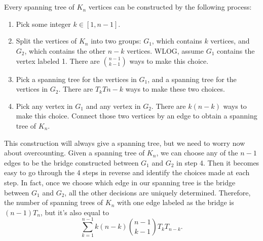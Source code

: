 \documentclass[12pt]{article}
\begin{document}
\section{}
\noindent{}\bigskip\par
Every spanning tree of $K_n$ vertices can be constructed by the following process:
\begin{enumerate}
    \item Pick some integer $k \in [1,n-1]$.
    \item Split the vertices of $K_n$ into two groups: $G_1$, which contains $k$ vertices, and $G_2$, which contains the other $n-k$ vertices. WLOG, assume $G_1$ contains the vertex labeled 1. There are $\binom{n-1}{k-1}$ ways to make this choice.
    \item Pick a spanning tree for the vertices in $G_1$, and a spanning tree for the vertices in $G_2$. There are $T_kT{n-k}$ ways to make these two choices.
    \item Pick any vertex in $G_1$ and any vertex in $G_2$. There are $k(n-k)$ ways to make this choice. Connect those two vertices by an edge to obtain a spanning tree of $K_n$.
    \end{enumerate}
\par
This construction will always give a spanning tree, but we need to worry now about overcounting. Given a spanning tree of $K_n$, we can choose any of the $n-1$ edges to be the bridge constructed between $G_1$ and $G_2$ in step 4. Then it becomes easy to go through the 4 steps in reverse and identify the choices made at each step. In fact, once we choose which edge in our spanning tree is the bridge between $G_1$ and $G_2$, all the other decisions are uniquely determined. Therefore, the number of spanning trees of $K_n$ with one edge labeled as the bridge is $(n-1)T_n$, but it's also equal to
\[ \sum_{k=1}^{n-1} k (n-k) \binom{n-1}{k-1} T_k T_{n-k}. \]
\end{document}
